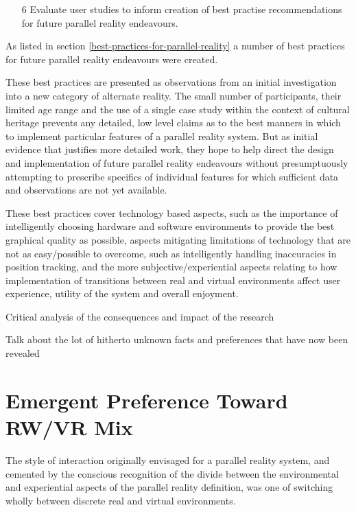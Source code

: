 \begin{enumerate}
	\item[6] Evaluate user studies to inform creation of best practise recommendations for future parallel reality endeavours.
\end{enumerate}

As listed in section \ref{best-practices-for-parallel-reality} a number of best practices for future parallel reality endeavours were created.

These best practices are presented as observations from an initial investigation into a new category of alternate reality. The small number of participants, their limited age range and the use of a single case study within the context of cultural heritage prevents any detailed, low level claims as to the best manners in which to implement particular features of a parallel reality system. But as initial evidence that justifies more detailed work, they hope to help direct the design and implementation of future parallel reality endeavours without presumptuously attempting to prescribe specifics of individual features for which sufficient data and observations are not yet available.

These best practices cover technology based aspects, such as the importance of intelligently choosing hardware and software environments to provide the best graphical quality as possible, aspects mitigating limitations of technology that are not as easy/possible to overcome, such as intelligently handling inaccuracies in position tracking, and the more subjective/experiential aspects relating to how implementation of transitions between real and virtual environments affect user experience, utility of the system and overall enjoyment.



Critical analysis of the consequences and impact of the research



Talk about the lot of hitherto unknown facts and preferences that have now been revealed




\section{Emergent Preference Toward RW/VR Mix}

The style of interaction originally envisaged for a parallel reality system, and cemented by the conscious recognition of the divide between the environmental and experiential aspects of the parallel reality definition, was one of switching wholly between discrete real and virtual environments.

